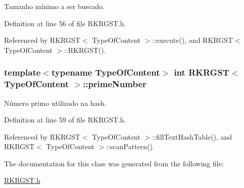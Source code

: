 Tamanho mínimo a ser buscado. 



Definition at line 56 of file R\+K\+R\+G\+S\+T.\+h.



Referenced by R\+K\+R\+G\+S\+T$<$ Type\+Of\+Content $>$\+::execute(), and R\+K\+R\+G\+S\+T$<$ Type\+Of\+Content $>$\+::\+R\+K\+R\+G\+S\+T().

\hypertarget{classRKRGST_aea66b780697be63c91342029335ad8ef}{
\subsubsection[{prime\+Number}]{\setlength{\rightskip}{0pt plus 5cm}template$<$typename Type\+Of\+Content$>$ int {\bf R\+K\+R\+G\+S\+T}$<$ Type\+Of\+Content $>$\+::prime\+Number}}\label{classRKRGST_aea66b780697be63c91342029335ad8ef}


Número primo utilizado na hash. 



Definition at line 59 of file R\+K\+R\+G\+S\+T.\+h.



Referenced by R\+K\+R\+G\+S\+T$<$ Type\+Of\+Content $>$\+::fill\+Text\+Hash\+Table(), and R\+K\+R\+G\+S\+T$<$ Type\+Of\+Content $>$\+::scan\+Pattern().



The documentation for this class was generated from the following file\+:\begin{DoxyCompactItemize}
\item 
\hyperlink{RKRGST_8h}{R\+K\+R\+G\+S\+T.\+h}\end{DoxyCompactItemize}
